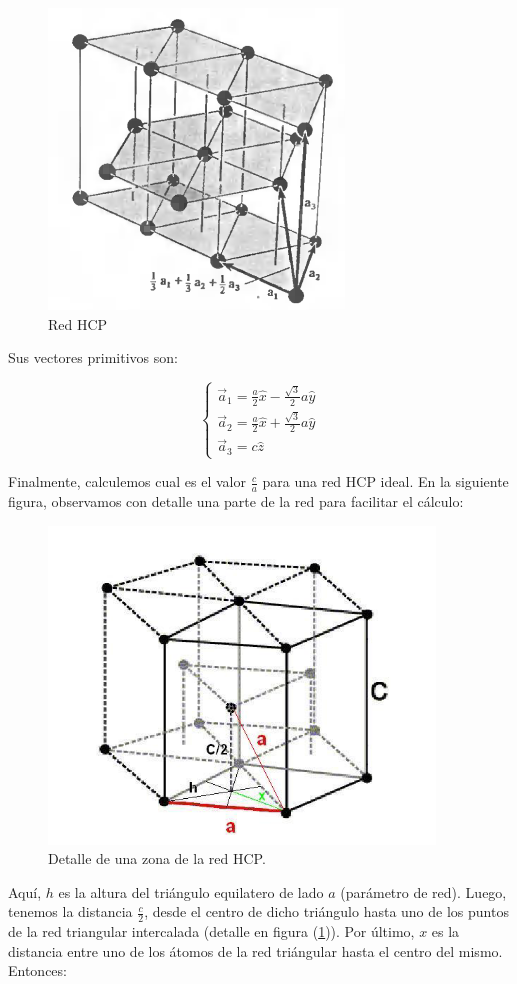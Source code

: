 \documentclass[a4paper]{article}
\begin{document}
\begin{figure}[H]
  \centering
  \includegraphics[width=0.5\linewidth,height=0.5\linewidth]{red3d_hcp.png}
  \caption{Red HCP}
  \label{fig:red3d_hcp}
\end{figure}

Sus vectores primitivos son:

$$\begin{cases}
\vec{a}_{1} = \frac{a}{2}\hat{x} - \frac{\sqrt{3}}{2}a\hat{y} \\
\vec{a}_{2} = \frac{a}{2}\hat{x} + \frac{\sqrt{3}}{2}a\hat{y} \\
\vec{a}_{3} = c\hat{z}
\end{cases}$$


Finalmente, calculemos cual es el valor $\frac{c}{a}$ para una red HCP ideal. En la siguiente figura, observamos con detalle una parte de la red para facilitar el c\'alculo:

\begin{figure}[H]
  \centering
  \includegraphics[width=0.5\linewidth,height=0.4\linewidth]{red3d_hcp_r.png}
  \caption{Detalle de una zona de la red HCP.}
  \label{fig:red3d_hcp_r}
\end{figure}

Aqu\'i, $h$ es la altura del tri\'angulo equilatero de lado $a$ (par\'ametro de red). Luego, tenemos la distancia $\frac{c}{2}$, desde el centro de dicho tri\'angulo hasta uno de los puntos de la red triangular intercalada (detalle en figura (\ref{fig:red3d_hcp})). Por \'ultimo, $x$ es la distancia entre uno de los \'atomos de la red tri\'angular hasta el centro del mismo. Entonces:
\end{document}
